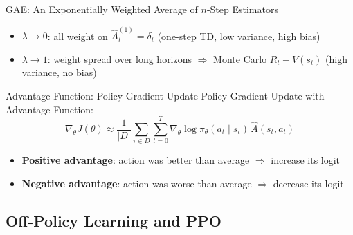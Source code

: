 \begin{frame}{GAE: An Exponentially Weighted Average of $n$-Step Estimators}
  \vspace{0.2em}
  \footnotesize
  \begin{itemize}[nosep]
    \item $\lambda\to 0$: all weight on $\hat{A}_t^{(1)}=\delta_t$ (one-step TD, low variance, high bias)
    \item $\lambda\to 1$: weight spread over long horizons $\Rightarrow$ Monte Carlo $R_t-V(s_t)$ (high variance, no bias)
  \end{itemize}
\end{frame}

\begin{frame}{Advantage Function: Policy Gradient Update}
  Policy Gradient Update with Advantage Function:
  \[
    \nabla_\theta J(\theta) \approx \frac{1}{|D|} \sum_{\tau \in D} \sum_{t=0}^{T} \nabla_\theta \log \pi_\theta(a_t \mid s_t) \, \hat{A}(s_t, a_t)
  \]

  \begin{itemize}[nosep]
    \item \textbf{Positive advantage}: action was better than average $\Rightarrow$ increase its logit
    \item \textbf{Negative advantage}: action was worse than average $\Rightarrow$ decrease its logit
  \end{itemize}
\end{frame}

\subsection{Off-Policy Learning and PPO}


